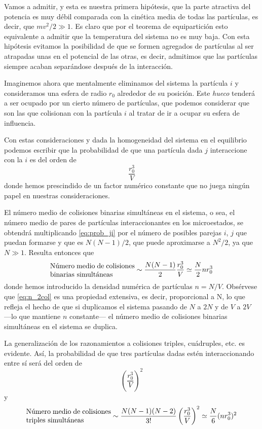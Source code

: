Vamos a admitir, y esta es nuestra primera hipótesis, que la parte atractiva del potencia es muy débil comparada con la cinética media de todas las partículas, es decir, que $mv^2/2 \gg 1$. Es claro que por el teorema de equipartición esto equivalente	a admitir que la temperatura del sistema no es muy baja.
Con esta hipótesis evitamos la posibilidad de que se formen agregados de partículas al ser atrapadas unas 	en el potencial de las otras, es decir, admitimos que las partículas siempre acaban separándose después de la interacción.

Imaginemos ahora que mentalmente eliminamos del sistema la partícula $i$ y consideramos una esfera de radio $r_0$ alrededor de su posición. Este \emph{hueco} tenderá a ser ocupado por un cierto número de partículas, que podemos considerar que son las que colisionan con la partícula $i$ al tratar de ir a ocupar su esfera de influencia.

Con estas consideraciones y dada la homogeneidad del sistema en el equilibrio podemos escribir que la probabilidad de que una partícula dada $j$ interaccione con la $i$ es del orden de
\begin{equation}\label{eq:prob_ji}
	\frac{r_0^3}{V}
\end{equation}
donde hemos prescindido de un factor numérico constante que no juega ningún papel en nuestras consideraciones.

El número medio de colisiones binarias simultáneas en el sistema, o sea, el número medio de pares de partículas interaccionantes en los microestados, se obtendrá multiplicando \eqref{eq:prob_ji} por el número de posibles parejas $i$, $j$ que puedan formarse y que es $N ( N - 1)/2$, que puede aproximarse a $N^2 /2$, ya que $N \gg 1$.
Resulta entonces que
\begin{equation}\label{eq:n_2col}
	\parbox{12em}{Número medio de colisiones\\binarias simultáneas} \sim \frac{N ( N - 1)}{2}\frac{r_0^3}{V} \simeq \frac{N}{2}nr_0^3
\end{equation}
donde hemos introducido la densidad numérica de partículas $n = N/V$. Obsérvese que \eqref{eq:n_2col} es una propiedad extensiva, es decir, proporcional a N, lo que refleja el hecho de que si duplicamos el sistema pasando de $N$ a $2N$ y de $V$ a $2V$ ---lo que mantiene $n$ constante--- el número medio de colisiones binarias simultáneas en el sistema se duplica.

La generalización de los razonamientos a colisiones triples, cuádruples, etc. es evidente.
Así, la probabilidad de que tres partículas dadas estén interaccionando
entre sí será del orden de
\begin{equation}
	\left( \frac{r_0^3}{V}\right)^2
\end{equation}
y
\begin{equation}\label{eq:n_3col}
	\parbox{12em}{Número medio de colisiones\\triples simultáneas} \sim  \frac{N (N-1)(N-2)}{3!}\left( \frac{r_0^3}{V}\right)^2 \simeq \frac{N}{6}(nr_0^3)^2
\end{equation}

